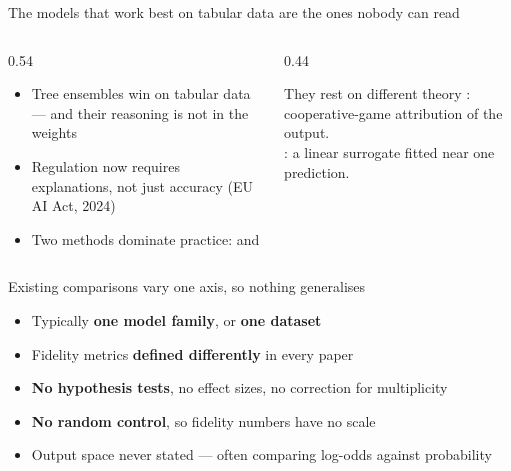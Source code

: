 \begin{frame}{The models that work best on tabular data are the ones nobody can read}
\begin{columns}[T]
\begin{column}{0.54\textwidth}
\begin{itemize}\setlength\itemsep{0.6em}
  \item Tree ensembles win on tabular data --- and their reasoning is not in the weights
  \item Regulation now requires explanations, not just accuracy (EU AI Act, 2024)
  \item Two methods dominate practice: \shap{} and \lime{}
\end{itemize}
\end{column}
\begin{column}{0.44\textwidth}
\small
\begin{block}{They rest on different theory}
\shap{}: cooperative-game attribution of the output.\\[0.4em]
\lime{}: a linear surrogate fitted near one prediction.
\end{block}
\end{column}
\end{columns}
\end{frame}

\begin{frame}{Existing comparisons vary one axis, so nothing generalises}
\begin{itemize}\setlength\itemsep{0.7em}
  \item Typically \textbf{one model family}, or \textbf{one dataset}
  \item Fidelity metrics \textbf{defined differently} in every paper
  \item \textbf{No hypothesis tests}, no effect sizes, no correction for multiplicity
  \item \textbf{No random control}, so fidelity numbers have no scale
  \item Output space never stated --- often comparing log-odds against probability
\end{itemize}
\end{frame}

